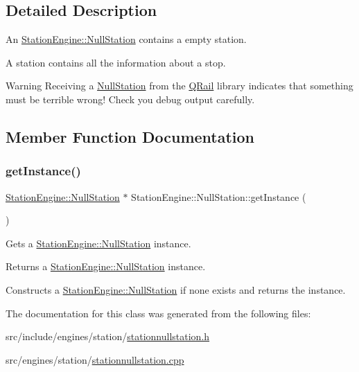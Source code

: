 \subsection{Detailed Description}
An \mbox{\hyperlink{classQRail_1_1StationEngine_1_1NullStation}{Station\+Engine\+::\+Null\+Station}} contains a empty station. 

A station contains all the information about a stop. \begin{DoxyWarning}{Warning}
Receiving a \mbox{\hyperlink{classQRail_1_1StationEngine_1_1NullStation}{Null\+Station}} from the \mbox{\hyperlink{namespaceQRail}{Q\+Rail}} library indicates that something must be terrible wrong! Check you debug output carefully. 
\end{DoxyWarning}


\subsection{Member Function Documentation}
\mbox{\label{classQRail_1_1StationEngine_1_1NullStation_a620d1cc84bf91ad1c2cadf1f810c9832}} 
\subsubsection{\texorpdfstring{getInstance()}{getInstance()}}
{\footnotesize\ttfamily \mbox{\hyperlink{classQRail_1_1StationEngine_1_1NullStation}{Station\+Engine\+::\+Null\+Station}} $\ast$ Station\+Engine\+::\+Null\+Station\+::get\+Instance (\begin{DoxyParamCaption}{ }\end{DoxyParamCaption})\hspace{0.3cm}{\ttfamily [static]}}



Gets a \mbox{\hyperlink{classQRail_1_1StationEngine_1_1NullStation}{Station\+Engine\+::\+Null\+Station}} instance. 

\begin{DoxyReturn}{Returns}
a \mbox{\hyperlink{classQRail_1_1StationEngine_1_1NullStation}{Station\+Engine\+::\+Null\+Station}} instance.
\end{DoxyReturn}
Constructs a \mbox{\hyperlink{classQRail_1_1StationEngine_1_1NullStation}{Station\+Engine\+::\+Null\+Station}} if none exists and returns the instance. 

The documentation for this class was generated from the following files\+:\begin{DoxyCompactItemize}
\item 
src/include/engines/station/\mbox{\hyperlink{stationnullstation_8h}{stationnullstation.\+h}}\item 
src/engines/station/\mbox{\hyperlink{stationnullstation_8cpp}{stationnullstation.\+cpp}}\end{DoxyCompactItemize}
